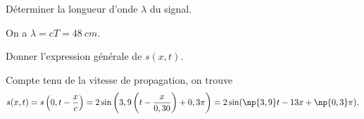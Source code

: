 \begin{enonce}
Déterminer la longueur d'onde $\lambda$ du signal.
\end{enonce}


\begin{corrige}
On a $\lambda=cT=\SI{48}{cm}$.
\end{corrige}





\begin{enonce}
Donner l'expression générale de $s(x,t)$.
\end{enonce}


\begin{corrige}
Compte tenu de la vitesse de propagation, on trouve
\begin{equation*}
s(x,t)=s\left(0,t-\dfrac{x}{c}\right)=2\sin\left(3,9\left(t-\dfrac{x}{0,30}\right)+0,3\pi\right)=2\sin(\np{3,9} t-13 x+ \np{0,3}\pi).
\end{equation*}
\end{corrige}

\finEntrainement



\afficheReponsesMelangees

\finFicheEntrainement                                                                        %


\ifdefined\mainIsLoaded\else
\printReponsesEtCorriges
\fi
